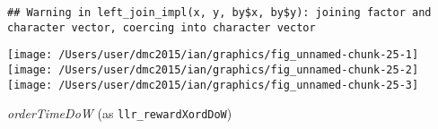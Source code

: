 \documentclass[10pt]{report}
\newenvironment{Shaded}{}{}
\newcommand{\KeywordTok}[1]{\textcolor[rgb]{0.00,0.44,0.13}{\textbf{{#1}}}}
\newcommand{\DataTypeTok}[1]{\textcolor[rgb]{0.56,0.13,0.00}{{#1}}}
\newcommand{\StringTok}[1]{\textcolor[rgb]{0.25,0.44,0.63}{{#1}}}
\newcommand{\NormalTok}[1]{{#1}}
\begin{document}
\begin{Shaded}
\end{Shaded}

\begin{verbatim}
## Warning in left_join_impl(x, y, by$x, by$y): joining factor and character vector, coercing into character vector
\end{verbatim}

\begin{Shaded}
\end{Shaded}

\begin{center}\texttt{[image: /Users/user/dmc2015/ian/graphics/fig\_unnamed-chunk-25-1]} \texttt{[image: /Users/user/dmc2015/ian/graphics/fig\_unnamed-chunk-25-2]} \texttt{[image: /Users/user/dmc2015/ian/graphics/fig\_unnamed-chunk-25-3]} \end{center}

\emph{orderTimeDoW} (as \texttt{llr\_rewardXordDoW})
\end{document}
